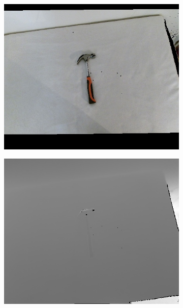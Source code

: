 \begin{figure}
	\centering
	\begin{subfigure}[b]{0.3\textwidth}
		\includegraphics[width=\textwidth]{img/methods/rgbd/rgb.jpg}
	\end{subfigure}
	\begin{subfigure}[b]{0.3\textwidth}
		\includegraphics[width=\textwidth]{img/methods/rgbd/depth.jpg}
	\end{subfigure}
	\begin{subfigure}[b]{0.3\textwidth}

\end{subfigure}
\end{figure}
